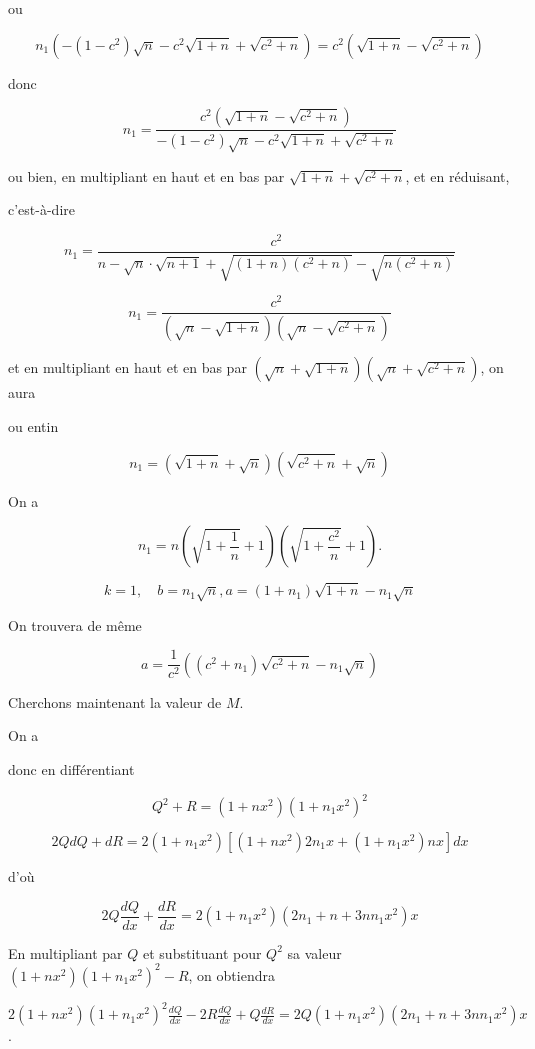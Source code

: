 \documentclass{article}
\begin{document}
ou

\[
n_{1}\left(-\left(1-c^{2}\right) \sqrt{n}-c^{2} \sqrt{1+n}+\sqrt{c^{2}+n}\right)=c^{2}\left(\sqrt{1+n}-\sqrt{c^{2}+n}\right)
\]

donc

\[
n_{1}=\frac{c^{2}\left(\sqrt{1+n}-\sqrt{c^{2}+n}\right)}{-\left(1-c^{2}\right) \sqrt{n}-c^{2} \sqrt{1+n}+\sqrt{c^{2}+n}}
\]

ou bien, en multipliant en haut et en bas par \(\sqrt{1+n}+\sqrt{c^{2}+n}\), et en réduisant,

c'est-à-dire

\[
n_{1}=\frac{c^{2}}{n-\sqrt{n} \cdot \sqrt{n+1}+\sqrt{(1+n)\left(c^{2}+n\right)}-\sqrt{n\left(c^{2}+n\right)}}
\]

\[
n_{1}=\frac{c^{2}}{(\sqrt{n}-\sqrt{1+n})\left(\sqrt{n}-\sqrt{c^{2}+n}\right)}
\]

et en multipliant en haut et en bas par \((\sqrt{n}+\sqrt{1+n})\left(\sqrt{n}+\sqrt{c^{2}+n}\right)\),
on aura

ou entin

\[
n_{1}=(\sqrt{1+n}+\sqrt{n})\left(\sqrt{c^{2}+n}+\sqrt{n}\right)
\]

On a

\[
n_{1}=n\left(\sqrt{1+\frac{1}{n}}+1\right)\left(\sqrt{1+\frac{c^{2}}{n}}+1\right) .
\]

\[
k=1, \quad b=n_{1} \sqrt{n}, a=\left(1+n_{1}\right) \sqrt{1+n}-n_{1} \sqrt{n}
\]

On trouvera de même

\[
a=\frac{1}{c^{2}}\left(\left(c^{2}+n_{1}\right) \sqrt{c^{2}+n}-n_{1} \sqrt{n}\right)
\]

Cherchons maintenant la valeur de \(M\).

On a

donc en différentiant

\[
Q^{2}+R=\left(1+n x^{2}\right)\left(1+n_{1} x^{2}\right)^{2}
\]

\[
2 Q d Q+d R=2\left(1+n_{1} x^{2}\right)\left[\left(1+n x^{2}\right) 2 n_{1} x+\left(1+n_{1} x^{2}\right) n x\right] d x
\]

d'où

\[
2 Q \frac{d Q}{d x}+\frac{d R}{d x}=2\left(1+n_{1} x^{2}\right)\left(2 n_{1}+n+3 n n_{1} x^{2}\right) x
\]

En multipliant par \(Q\) et substituant pour \(Q^{2}\) sa valeur \(\left(1+n x^{2}\right)\left(1+n_{1} x^{2}\right)^{2}-R\), on obtiendra

\(2\left(1+n x^{2}\right)\left(1+n_{1} x^{2}\right)^{2} \frac{d Q}{d x}-2 R \frac{d Q}{d x}+Q \frac{d R}{d x}=2 Q\left(1+n_{1} x^{2}\right)\left(2 n_{1}+n+3 n n_{1} x^{2}\right) x\).
\end{document}
